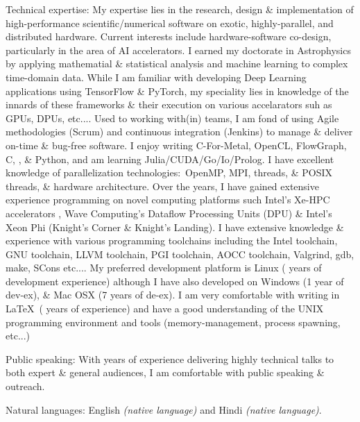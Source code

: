 \documentclass[10pt,a4paper]{article}
\begin{document}
  \inlineheadsection  %
  {Technical expertise:}
  {My expertise lies in the research, design \& implementation of high-performance scientific/numerical software on exotic, highly-parallel, and distributed hardware. Current interests include hardware-software co-design, particularly in the area of AI accelerators. I earned my doctorate in Astrophysics by applying mathematial \& statistical analysis and machine learning to complex time-domain data. While I am familiar with developing Deep Learning applications using TensorFlow \& PyTorch, my speciality lies in knowledge of the innards of these frameworks \& their execution on various accelarators suh as GPUs, DPUs, etc.... Used to working with(in) teams, I am fond of using Agile methodologies (Scrum) and continuous integration (Jenkins) to manage \& deliver on-time \& bug-free software. I enjoy writing C-For-Metal, OpenCL, FlowGraph, C\nsp, \CPP\nsp, \& Python, and am learning Julia/\nsp CUDA/\nsp Go/\nsp Io/\nsp Prolog. I have excellent knowledge of parallelization technologies:\ OpenMP, MPI,  threads, \& POSIX threads, \& hardware architecture. Over the years, I have gained extensive experience programming on novel computing platforms such Intel's Xe-HPC accelerators , Wave Computing's Dataflow Processing Units (DPU) \& Intel's Xeon Phi (Knight's Corner \& Knight's Landing). I have extensive knowledge \& experience with various programming toolchains including the Intel toolchain, GNU toolchain, LLVM toolchain, PGI toolchain, AOCC toolchain, Valgrind, gdb, make, SCons etc.... My preferred development platform is Linux ( years of development experience) although I have also developed on Windows (1 year of dev-ex), \& Mac OSX (7 years of de-ex). I am very comfortable with writing in \LaTeX \ ( years of experience) and have a good understanding of the UNIX programming environment and tools (memory-management, process spawning, etc...)}

  \vspace{1.0em}

  \inlineheadsection
    {Public speaking:}
    {With years of experience delivering highly technical talks to both expert \& general audiences, I am comfortable with public speaking \& outreach.}

  \vspace{1.0em}

  \inlineheadsection
    {Natural languages:}
    {English \emph{(native language)} and Hindi \emph{(native language)}.}
\end{document}
